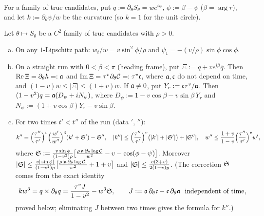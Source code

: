 For a family of true candidates, put $q:=\partial_\theta S_\theta=we^{i\psi}$, $\phi:=\beta-\psi$ ($\beta=\arg r$), and let
$k:=\partial_\theta\psi/w$ be the curvature (so $k=1$ for the unit circle).

\begin{lemma}\label{lem:transport}
Let $\theta\mapsto S_\theta$ be a $C^2$ family of true candidates with $\rho>0$.
\begin{enumerate}[(a)]\setlength{\itemsep}{1pt}
\item On any $1$-Lipschitz path: $w_t/w=v\sin^2\phi/\rho$ and $\psi_t=-(v/\rho)\sin\phi\cos\phi$.
\item On a straight run with $0<\beta<\pi$ (heading frame), put $\Xi:=q+ve^{i\beta}\bar q$. Then $\operatorname{Re}\Xi=\partial_\theta h=:\mathfrak{a}$ and
$\operatorname{Im}\Xi=\tau^v\partial_\theta\mathcal C=:\tau^v\mathfrak{c}$, where $\mathfrak{a},\mathfrak{c}$ do not depend on time, and
$(1-v)w\le|\Xi|\le(1+v)w$. If $\mathfrak{a}\ne0$, put $Y_r:=\mathfrak{c}\tau^v/\mathfrak{a}$. Then $(1-v^2)q=\mathfrak{a}(D_\psi+iN_\psi)$, where
$D_\psi:=1-v\cos\beta-v\sin\beta\,Y_r$ and $N_\psi:=(1+v\cos\beta)Y_r-v\sin\beta$.
\item For two times $t'<t''$ of the run (data $'$, $''$):
\[
k''=\Bigl(\frac{\tau''}{\tau'}\Bigr)^v\Bigl(\frac{w'}{w''}\Bigr)^3(k'+\mathfrak{S}')-\mathfrak{S}'',\quad
|k''|\le\Bigl(\frac{\tau''}{\tau'}\Bigr)^v\bigl(|k'|+|\mathfrak{S}'|\bigr)+|\mathfrak{S}''|,\quad
w''\le\frac{1+v}{1-v}\Bigl(\frac{\tau''}{\tau'}\Bigr)^vw',
\]
where $\mathfrak{S}:=\frac{v\sin\phi}{(1-v^2)\rho}\bigl[\frac{\rho\,\mathfrak{a}\,\partial_\theta\log\mathcal C}{w^2}-v-\cos(\phi-\psi)\bigr]$. Moreover
$|\mathfrak{S}|\le\frac{v|\sin\phi|}{(1-v^2)\rho}\bigl[\frac{\rho|\mathfrak{a}\,\partial_\theta\log\mathcal C|}{w^2}+1+v\bigr]$ and
$|\mathfrak{S}|\le\frac{v(3+v)}{2(1-v)y}$. \textup(The correction $\mathfrak{S}$ comes from the exact identity
\[
kw^3=q\times\partial_\theta q=\frac{\tau^vJ}{1-v^2}-w^3\mathfrak{S},\qquad J:=\mathfrak{a}\,\partial_\theta\mathfrak{c}-\mathfrak{c}\,\partial_\theta\mathfrak{a}
\ \text{ independent of time,}
\]
proved below; eliminating $J$ between two times gives the formula for $k''$.\textup)
\end{enumerate}
\end{lemma}
